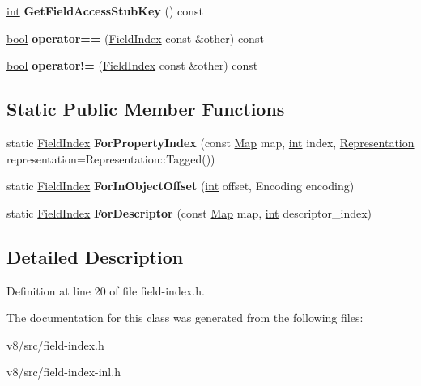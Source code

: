\begin{DoxyCompactItemize}
\mbox{\hyperlink{classint}{int}} {\bfseries Get\+Field\+Access\+Stub\+Key} () const
\item 
\mbox{\label{classv8_1_1internal_1_1FieldIndex_ab9c009ac443b11027f12bdc9e44612a7}} 
\mbox{\hyperlink{classbool}{bool}} {\bfseries operator==} (\mbox{\hyperlink{classv8_1_1internal_1_1FieldIndex}{Field\+Index}} const \&other) const
\item 
\mbox{\label{classv8_1_1internal_1_1FieldIndex_a03ed68e896a172fdd0073c8cbf5dc156}} 
\mbox{\hyperlink{classbool}{bool}} {\bfseries operator!=} (\mbox{\hyperlink{classv8_1_1internal_1_1FieldIndex}{Field\+Index}} const \&other) const
\end{DoxyCompactItemize}
\subsection*{Static Public Member Functions}
\begin{DoxyCompactItemize}
\item 
\mbox{\label{classv8_1_1internal_1_1FieldIndex_afbff585afb7813b12663b6d0db58488d}} 
static \mbox{\hyperlink{classv8_1_1internal_1_1FieldIndex}{Field\+Index}} {\bfseries For\+Property\+Index} (const \mbox{\hyperlink{classv8_1_1internal_1_1Map}{Map}} map, \mbox{\hyperlink{classint}{int}} index, \mbox{\hyperlink{classv8_1_1internal_1_1Representation}{Representation}} representation=Representation\+::\+Tagged())
\item 
\mbox{\label{classv8_1_1internal_1_1FieldIndex_af1798f86c468e237b3e01c6a7f56ba06}} 
static \mbox{\hyperlink{classv8_1_1internal_1_1FieldIndex}{Field\+Index}} {\bfseries For\+In\+Object\+Offset} (\mbox{\hyperlink{classint}{int}} offset, Encoding encoding)
\item 
\mbox{\label{classv8_1_1internal_1_1FieldIndex_af53f99aef4637cdf7fa011d492d6cbc1}} 
static \mbox{\hyperlink{classv8_1_1internal_1_1FieldIndex}{Field\+Index}} {\bfseries For\+Descriptor} (const \mbox{\hyperlink{classv8_1_1internal_1_1Map}{Map}} map, \mbox{\hyperlink{classint}{int}} descriptor\+\_\+index)
\end{DoxyCompactItemize}


\subsection{Detailed Description}


Definition at line 20 of file field-\/index.\+h.



The documentation for this class was generated from the following files\+:\begin{DoxyCompactItemize}
\item 
v8/src/field-\/index.\+h\item 
v8/src/field-\/index-\/inl.\+h\end{DoxyCompactItemize}
